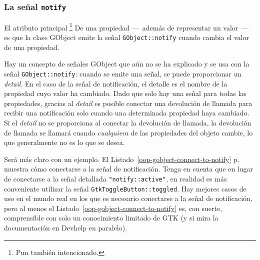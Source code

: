 \subsubsection{La señal \lstinline{notify} }

El atributo principal \footnote{Pun también intencionado.} De una propiedad ---~además de representar un valor~--- es que la clase GObject emite la señal \lstinline{GObject::notify} cuando cambia el valor de una propiedad.

Hay un concepto de señales GObject que aún no se ha explicado y se usa con la señal \lstinline{GObject::notify}: cuando se emite una señal, se puede proporcionar un \emph {detail}. En el caso de la señal de notificación, el detalle es el nombre de la propiedad cuyo valor ha cambiado. Dado que solo hay una señal para todas las propiedades, gracias al \emph{detail} es posible conectar una devolución de llamada para recibir una notificación solo cuando una determinada propiedad haya cambiado. Si el \emph{detail} no se proporciona al conectar la devolución de llamada, la devolución de llamada se llamará cuando \emph{cualquiera} de las propiedades del objeto cambie, lo que generalmente no es lo que se desea.

Será más claro con un ejemplo. El Listado~\ref{oop-gobject-connect-to-notify} p.~\pageref{oop-gobject-connect-to-notify} muestra cómo conectarse a la señal de notificación. Tenga en cuenta que en lugar de conectarse a la señal detallada \lstinline{"notify::active"}, en realidad es más conveniente utilizar la señal \lstinline{GtkToggleButton::toggled}. Hay mejores casos de uso en el mundo real en los que es necesario conectarse a la señal de notificación, pero al menos el Listado~\ref{oop-gobject-connect-to-notify} es, con suerte, comprensible con solo un conocimiento limitado de GTK (y si mira la documentación en Devhelp en paralelo).


